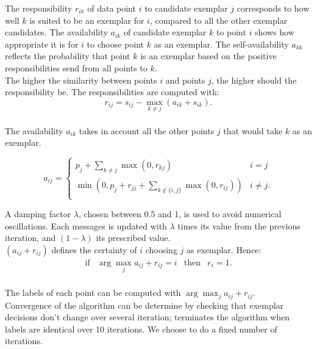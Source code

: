 \documentclass{ipol}
\begin{document}
The responsibility $r_{ik}$ of data point $i$ to candidate exemplar $j$
corresponds to how well $k$ is suited to be an exemplar for $i$, compared to
all the other exemplar candidates. The availability $a_{ik}$ of candidate
exemplar $k$ to point $i$ shows how appropriate it is for $i$ to choose point
$k$ as an exemplar. The self-availability $a_{kk}$ reflects the probability
that point $k$ is an exemplar based on the positive responsibilities send from
all points to $k$. \\

The higher the similarity between points $i$ and points $j$, the higher should
the responsibility be. The responsibilities are computed with:
\begin{equation*}
r_{ij} = s_{ij} - \max_{k \neq j}
(a_{ik} + s_{ik}).
\end{equation*} \\

The availability $a_{ik}$  takes in account all the other points $j$ that
would take $k$ as an exemplar.

\begin{equation*}
a_{ij} = \begin{cases}
	    p_j + \sum_{k \neq j} \max(0, r_{kj}) &  i = j \\
	    \min ( 0, p_j + r_{jj} + \sum_{k \notin \{i, j\} } \max (0, r_{ij}))
	    & i \neq j.\\
	 \end{cases}
\end{equation*}

A damping factor $\lambda$, chosen between 0.5 and 1, is used to avoid
numerical oscillations. Each messages is updated with $\lambda$ times its
value from the previous iteration, and $(1 - \lambda)$ its prescribed value.
\\

$(a_{ij} + r_{ij})$ defines the certainty of $i$ choosing $j$ as exemplar.
Hence:
\begin{equation*}
\begin{array}{cccc}
\text{if} & \arg \max_j a_{ij} + r_{ij} = i & \text{then} & e_i = 1. \\
\end{array}
\end{equation*}

The labels of each point can be computed with $\arg \max_j a_{ij} + r_{ij}$.
\\

Convergence of the algorithm can be determine by checking that exemplar
decisions don't change over several iteration;
\cite{frey07affinitypropagation} terminates the algorithm when labels are
identical over 10 iterations. We choose to do a fixed number of iterations.
\end{document}
